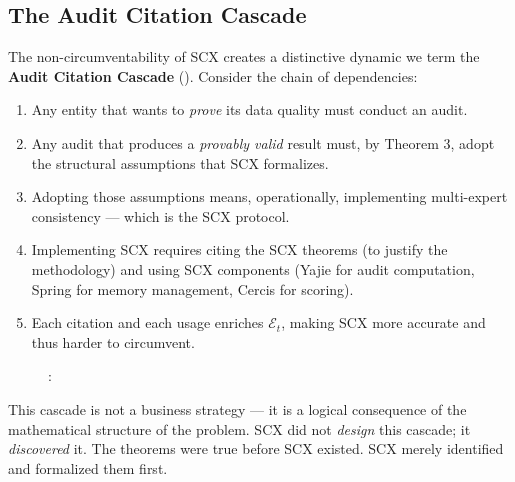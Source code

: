 \documentclass[12pt,a4paper]{article}
\theoremstyle{remark}
\newcommand{\SCX}{\textsf{SCX}}
\newcommand{\Yajie}{\textsf{Yajie}}
\begin{document}
\subsection{The Audit Citation Cascade}
The non-circumventability of SCX creates a distinctive dynamic we term the 
\textbf{Audit Citation Cascade} (). Consider the chain of dependencies:
\begin{enumerate}[label=(\arabic*), leftmargin=*]
 \item Any entity that wants to \textit{prove} its data quality must conduct an audit.
 \item Any audit that produces a \textit{provably valid} result must, by Theorem 3, 
 adopt the structural assumptions that SCX formalizes.
 \item Adopting those assumptions means, operationally, implementing multi-expert 
 consistency --- which is the SCX protocol.
 \item Implementing SCX requires citing the SCX theorems (to justify the methodology) 
 and using SCX components (Yajie for audit computation, Spring for memory 
 management, Cercis for scoring).
 \item Each citation and each usage enriches $\mathcal{E}_t$, making SCX more accurate 
 and thus harder to circumvent.
\end{enumerate}
\begin{figure}[H]
\centering
{}
\caption{:}
\label{fig:citation_cascade}
\end{figure}
This cascade is not a business strategy --- it is a logical consequence of the 
mathematical structure of the problem. SCX did not \textit{design} this cascade; 
it \textit{discovered} it. The theorems were true before SCX existed. SCX merely 
identified and formalized them first.
\end{document}
